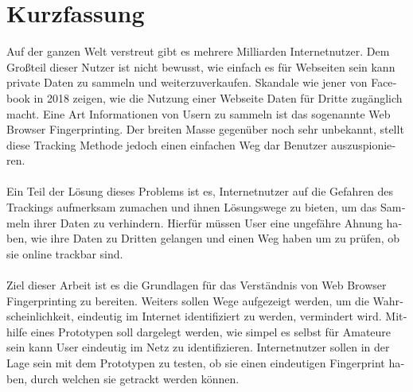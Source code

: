 \chapter{Kurzfassung}

\begin{german}
Auf der ganzen Welt verstreut gibt es mehrere Milliarden Internetnutzer. Dem Großteil dieser Nutzer ist nicht bewusst, wie einfach es für Webseiten sein kann private Daten zu sammeln und weiterzuverkaufen. Skandale wie jener von Facebook in 2018 zeigen, wie die Nutzung einer Webseite Daten für Dritte zugänglich macht. Eine Art Informationen von Usern zu sammeln ist das sogenannte Web Browser Fingerprinting. Der breiten Masse gegenüber noch sehr unbekannt, stellt diese Tracking Methode jedoch einen einfachen Weg dar Benutzer auszuspionieren.	\\\\
Ein Teil der Lösung dieses Problems ist es, Internetnutzer auf die Gefahren des Trackings aufmerksam zumachen und ihnen Lösungswege zu bieten, um das Sammeln ihrer Daten zu verhindern. Hierfür müssen User eine ungefähre Ahnung haben, wie ihre Daten zu Dritten gelangen und einen Weg haben um zu prüfen, ob sie online trackbar sind. \\\\
Ziel dieser Arbeit ist es die Grundlagen für das Verständnis von Web Browser Fingerprinting zu bereiten. Weiters sollen Wege aufgezeigt werden, um die Wahrscheinlichkeit, eindeutig im Internet identifiziert zu werden, vermindert wird. Mithilfe eines Prototypen soll dargelegt werden, wie simpel es selbst für Amateure sein kann User eindeutig im Netz zu identifizieren. Internetnutzer sollen in der Lage sein mit dem Prototypen zu testen, ob sie einen eindeutigen Fingerprint haben, durch welchen sie getrackt werden können.
\end{german}